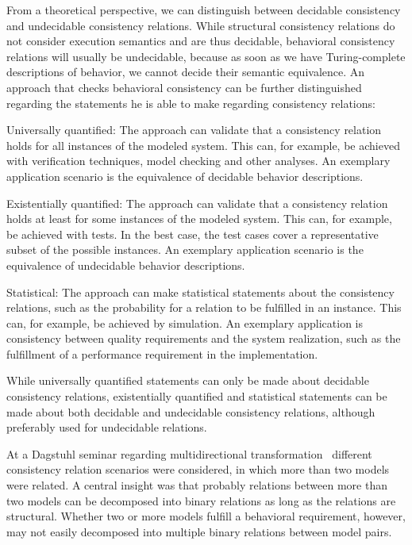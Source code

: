 From a theoretical perspective, we can distinguish between decidable consistency and undecidable consistency relations.
While structural consistency relations do not consider execution semantics and are thus decidable, behavioral consistency relations will usually be undecidable, because as soon as we have Turing-complete descriptions of behavior, we cannot decide their semantic equivalence. %
An approach that checks behavioral consistency can be further distinguished regarding the statements he is able to make regarding consistency relations:
\begin{properdescription}
    \item[Universally quantified:] The approach can validate that a consistency relation holds for all instances of the modeled system. This can, for example, be achieved with verification techniques, model checking and other analyses. An exemplary application scenario is the equivalence of decidable behavior descriptions.
    \item[Existentially quantified:] The approach can validate that a consistency relation holds at least for some instances of the modeled system. This can, for example, be achieved with tests. In the best case, the test cases cover a representative subset of the possible instances. An exemplary application scenario is the equivalence of undecidable behavior descriptions.
    \item[Statistical:] The approach can make statistical statements about the consistency relations, such as the probability for a relation to be fulfilled in an instance. This can, for example, be achieved by simulation. An exemplary application is consistency between quality requirements and the system realization, such as the fulfillment of a performance requirement in the implementation.
\end{properdescription}
While universally quantified statements can only be made about decidable consistency relations, existentially quantified and statistical statements can be made about both decidable and undecidable consistency relations, although preferably used for undecidable relations.

At a Dagstuhl seminar regarding multidirectional transformation~\cite{cleve2019dagstuhl} different consistency relation scenarios were considered, in which more than two models were related.
A central insight was that probably relations between more than two models can be decomposed into binary relations as long as the relations are structural.
Whether two or more models fulfill a behavioral requirement, however, may not easily decomposed into multiple binary relations between model pairs.

